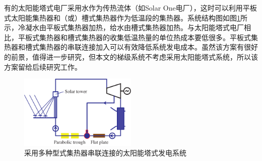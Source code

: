 有的太阳能塔式电厂采用水作为传热流体（如Solar One电厂），这时可以利用平板式太阳能集热器和（或）槽式集热器作为低温段的集热器。系统结构图如图\ref{fig:seriesCollection}所示，冷凝水由平板式集热器加热，给水由槽式集热器加热。与太阳能塔式电厂相比，平板式集热器和槽式集热器的收集低温热量的单位热成本要低很多。平板式集热器和槽式集热器的串联连接加入可以有效降低系统发电成本。虽然该方案有很好的前景，值得进一步研究，但本文的梯级系统不考虑采用太阳能塔式系统，所以该方案留给后续研究工作。

\begin{figure}[!ht]
\centering 
\includegraphics[width=0.5\textwidth]{fig/SeriesCollection}
\caption{采用多种型式集热器串联连接的太阳能塔式发电系统}\label{fig:seriesCollection}
\end{figure}

